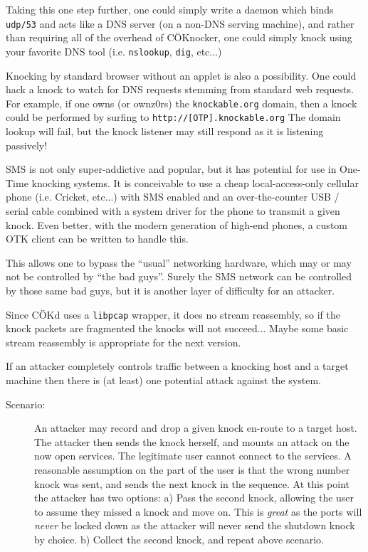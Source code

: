 \documentclass[landscape,twocolumn,headrule]{foils}
\begin{document}

Taking this one step further, one could simply write a daemon which binds \texttt{udp/53} and acts like a DNS server (on a non-DNS serving machine), and rather than requiring all of the overhead of C\"{O}Knocker, one could simply knock using your favorite DNS tool (i.e. \texttt{nslookup}, \texttt{dig}, etc...)

Knocking by standard browser without an applet is also a possibility.  One could hack a knock to watch for DNS requests stemming from standard web requests.  For example, if one owns (or ownz0rs) the \verb;knockable.org; domain, then a knock could be performed by surfing to \verb;http://[OTP].knockable.org;  The domain lookup will fail, but the knock listener may still respond as it is listening passively!


SMS is not only super-addictive and popular, but it has potential for use in One-Time knocking systems.  It is conceivable to use a cheap local-access-only cellular phone (i.e. Cricket, etc...) with SMS enabled and an over-the-counter USB / serial cable combined with a system driver for the phone to transmit a given knock.  Even better, with the modern generation of high-end phones, a custom OTK client can be written to handle this.

This allows one to bypass the ``usual'' networking hardware, which may or may not be controlled by ``the bad guys''.  Surely the SMS network can be controlled by those same bad guys, but it is another layer of difficulty for an attacker.


Since C\"{O}Kd uses a \texttt{libpcap} wrapper, it does no stream reassembly, so if the knock packets are fragmented the knocks will not succeed...  Maybe some basic stream reassembly is appropriate for the next version.


If an attacker completely controls traffic between a knocking host and a target machine then there is (at least) one potential attack against the system.

\begin{description}
\item[Scenario:]  An attacker may record and drop a given knock en-route to a target host.  The attacker then sends the knock herself, and mounts an attack on the now open services.  The legitimate user cannot connect to the services.  A reasonable assumption on the part of the user is that the wrong number knock was sent, and sends the next knock in the sequence.  At this point the attacker has two options:  a) Pass the second knock, allowing the user to assume they missed a knock and move on.  This is \emph{great} as the ports will \emph{never} be locked down as the attacker will never send the shutdown knock by choice.  b) Collect the second knock, and repeat above scenario.
\end{description}
\end{document}
